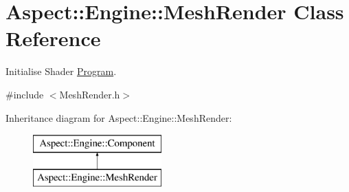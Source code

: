 \hypertarget{class_aspect_1_1_engine_1_1_mesh_render}{}\section{Aspect\+:\+:Engine\+:\+:Mesh\+Render Class Reference}
\label{class_aspect_1_1_engine_1_1_mesh_render}


Initialise Shader \mbox{\hyperlink{class_aspect_1_1_engine_1_1_program}{Program}}.  




{\ttfamily \#include $<$Mesh\+Render.\+h$>$}

Inheritance diagram for Aspect\+:\+:Engine\+:\+:Mesh\+Render\+:\begin{figure}[H]
\begin{center}
\leavevmode
\includegraphics[height=2.000000cm]{class_aspect_1_1_engine_1_1_mesh_render}
\end{center}
\end{figure}
